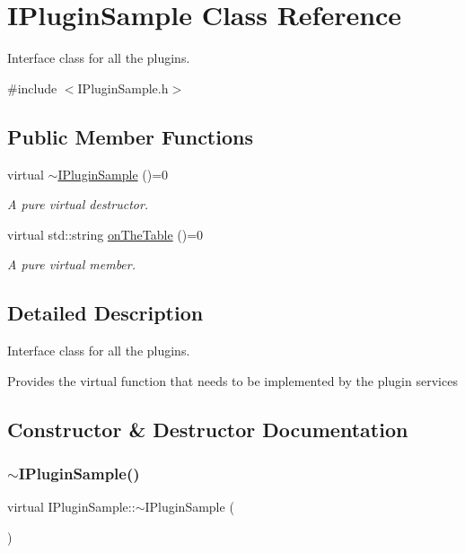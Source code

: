 \hypertarget{classIPluginSample}{}\section{I\+Plugin\+Sample Class Reference}
\label{classIPluginSample}


Interface class for all the plugins.  




{\ttfamily \#include $<$I\+Plugin\+Sample.\+h$>$}

\subsection*{Public Member Functions}
\begin{DoxyCompactItemize}
\item 
virtual \hyperlink{classIPluginSample_a666c3926428200be746eecf410284569}{$\sim$\+I\+Plugin\+Sample} ()=0
\begin{DoxyCompactList}\small\item\em A pure virtual destructor. \end{DoxyCompactList}\item 
virtual std\+::string \hyperlink{classIPluginSample_ad6be189a0df16e7f416f52dc74dd6085}{on\+The\+Table} ()=0
\begin{DoxyCompactList}\small\item\em A pure virtual member. \end{DoxyCompactList}\end{DoxyCompactItemize}


\subsection{Detailed Description}
Interface class for all the plugins. 

Provides the virtual function that needs to be implemented by the plugin services 

\subsection{Constructor \& Destructor Documentation}
\mbox{\label{classIPluginSample_a666c3926428200be746eecf410284569}} 
\subsubsection{\texorpdfstring{$\sim$\+I\+Plugin\+Sample()}{~IPluginSample()}}
{\footnotesize\ttfamily virtual I\+Plugin\+Sample\+::$\sim$\+I\+Plugin\+Sample (\begin{DoxyParamCaption}{ }\end{DoxyParamCaption})\hspace{0.3cm}{\ttfamily [pure virtual]}}



